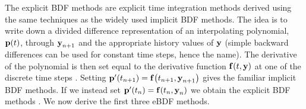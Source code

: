 The explicit BDF methods are explicit time integration methods derived using the same techniques as the widely used implicit BDF methods.
The idea is to write down a divided difference representation of an interpolating polynomial, ${\boldsymbol{\mathrm{p}}}(t)$, through $\boldsymbol{\mathrm{y}}_{n+1}$ and the appropriate history values of $\boldsymbol{\mathrm{y}}$ (simple backward differences can be used for constant time steps, hence the name).
The derivative of the polynomial is then set equal to the derivative function ${\boldsymbol{\mathrm{f}}{\left( t, \boldsymbol{\mathrm{y}} \right)}}$ at one of the discrete time steps \cite[400]{HairerNorsettWanner}.
Setting ${\boldsymbol{\mathrm{p}}}'(t_{n+1}) = {\boldsymbol{\mathrm{f}}{\left( t_{n+1}, \boldsymbol{\mathrm{y}}_{n+1} \right)}}$ gives the familiar implicit BDF methods.
If we instead set ${\boldsymbol{\mathrm{p}}}'(t_{n}) = {\boldsymbol{\mathrm{f}}{\left( t_{n}, \boldsymbol{\mathrm{y}}_{n} \right)}}$ we obtain the explicit BDF methods \cite[364]{HairerNorsettWanner}.
We now derive the first three eBDF methods.

